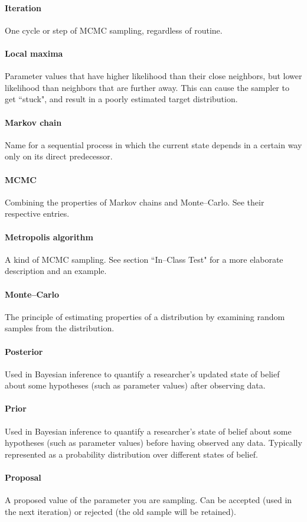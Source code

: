 	\paragraph{Iteration} One cycle or step of MCMC sampling, regardless of routine.
	\paragraph{Local maxima} Parameter values that have higher likelihood than their close neighbors, but lower likelihood than neighbors that are further away. This can cause the sampler to get ``stuck", and result in a poorly estimated target distribution.
	\paragraph{Markov chain} Name for a sequential process in which the current state depends in a certain way only on its direct predecessor.
	\paragraph{MCMC} Combining the properties of Markov chains and Monte--Carlo. See their respective entries.
	\paragraph{Metropolis algorithm} A kind of MCMC sampling. See section ``In--Class Test" for a more elaborate description and an example.
	\paragraph{Monte--Carlo} The principle of estimating properties of a distribution by examining random samples from the distribution.
	\paragraph{Posterior} Used in Bayesian inference to quantify a researcher's updated state of belief about some hypotheses (such as parameter values) after observing data.
	\paragraph{Prior} Used in Bayesian inference to quantify a researcher's state of belief  about some hypotheses (such as parameter values) before having observed any data. Typically represented as a probability distribution over different states of belief.
	\paragraph{Proposal} A proposed value of the parameter you are sampling. Can be accepted (used in the next iteration) or rejected (the old sample will be retained).
